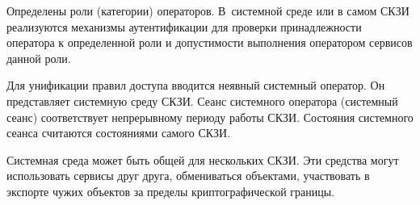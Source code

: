 
Определены роли (категории) операторов.
%
В~системной среде или в самом СКЗИ реализуются механизмы аутентификации для
проверки принадлежности оператора к определенной роли и допустимости выполнения
оператором сервисов данной роли.


Для унификации правил доступа вводится неявный системный оператор.
Он представляет системную среду СКЗИ. Сеанс системного оператора 
(системный сеанс) соответствует непрерывному периоду работы СКЗИ.
%
Состояния системного сеанса считаются состояниями самого СКЗИ.


Системная среда может быть общей для нескольких СКЗИ. Эти средства могут 
использовать сервисы друг друга, обмениваться объектами, участвовать в экспорте 
чужих объектов за пределы криптографической границы.

